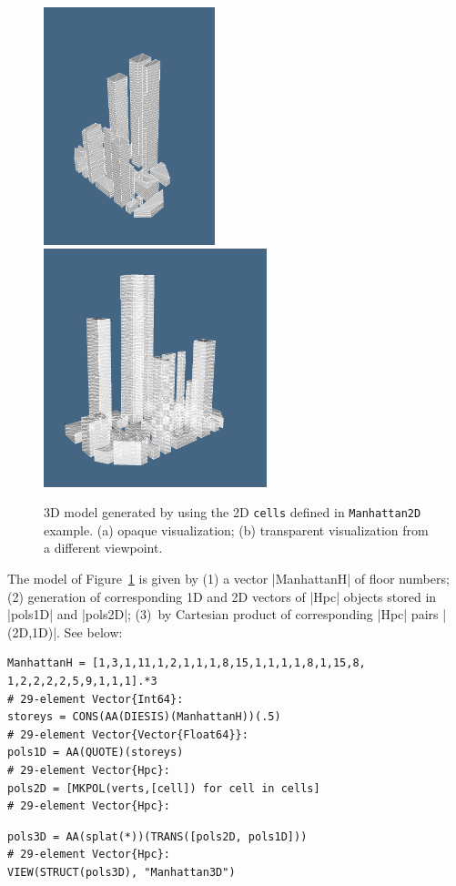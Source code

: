\begin{script}
\begin{figure}
   \includegraphics[width=1.955in]{chapter-01/figs/manhattan3d-1.pdf}
   \includegraphics[width=2.55in]{chapter-01/figs/manhattan3d-2.pdf}
\caption{3D model generated by using the 2D \texttt{cells} defined in \texttt{Manhattan2D} example.
 (a) opaque visualization; (b) transparent visualization from a different viewpoint.}
\label{fig:1:FP3D}
\end{figure}

\begin{coding} 
\label{example:1:Manhattan3D}

The model of Figure~\ref{fig:1:FP3D} is given by (1) a vector |ManhattanH| of floor numbers; (2) generation of corresponding 1D and 2D vectors of |Hpc| objects stored in |pols1D| and |pols2D|; (3)~by Cartesian product of corresponding |Hpc| pairs |(2D,1D)|. See below:

\begin{lstlisting}[language=JuliaLocal, style=julia, mathescape = true] 
ManhattanH = [1,3,1,11,1,2,1,1,1,8,15,1,1,1,1,8,1,15,8, 1,2,2,2,2,5,9,1,1,1].*3
# 29-element Vector{Int64}:
storeys = CONS(AA(DIESIS)(ManhattanH))(.5)
# 29-element Vector{Vector{Float64}}:
pols1D = AA(QUOTE)(storeys)
# 29-element Vector{Hpc}:
pols2D = [MKPOL(verts,[cell]) for cell in cells]
# 29-element Vector{Hpc}:
\end{lstlisting}
\begin{lstlisting}[language=JuliaLocal, style=julia, mathescape = true] 
pols3D = AA(splat(*))(TRANS([pols2D, pols1D]))
# 29-element Vector{Hpc}:
VIEW(STRUCT(pols3D), "Manhattan3D")
\end{lstlisting}



\end{coding}
\end{script}
